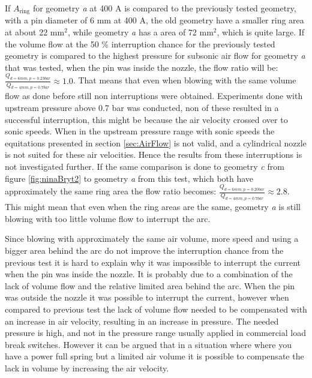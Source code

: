 \documentclass[10pt,a4paper]{article}
\begin{document}
If $A_\mathrm{{ring}}$ for geometry \textit{a} at 400 A is compared to the previously tested geometry, with a pin diameter of 6 mm at 400 A, the old geometry have a smaller ring area at about 22 $\mathrm{{mm^2}}$, while geometry \textit{a} has a area of 72 $\mathrm{{mm^2}}$, which is quite large. If the volume flow at the 50 \% interruption chance for the previously tested geometry is compared to the highest pressure for subsonic air flow for geometry \textit{a} that was tested, when the pin was inside the nozzle, the flow ratio will be: $\frac{Q_{d=6 mm, p=0.23 bar}}{Q_{d=4 mm, p=0.7 bar}}\approx 1.0$. That means that even when blowing with the same volume flow as done before still non interruptions were obtained. Experiments done with upstream pressure above 0.7 bar was conducted, non of these resulted in a successful interruption, this might be because the air velocity crossed over to sonic speeds. When in the upstream pressure range with sonic speeds the equitations presented in section \ref{sec:AirFlow} is not valid, and a cylindrical nozzle is not suited for these air velocities. Hence the results from these interruptions is not investigated further. If the same comparison is done to geometry \textit{c} from figure \ref{fig:ninaBryt2} to geometry \textit{a} from this test, which both have approximately the same ring area the flow ratio becomes: $\frac{Q_{d=6 mm, p=0.20 bar}}{Q_{d=4 mm, p=0.7 bar}}\approx 2.8$. This might mean that even when the ring areas are the same, geometry \textit{a} is still blowing with too little volume flow to interrupt the arc.

Since blowing with approximately the same air volume, more speed and using a bigger area behind the arc do not improve the interruption chance from the previous test it is hard to explain why it was impossible to interrupt the current when the pin was inside the nozzle. It is probably due to a combination of the lack of volume flow and the relative limited area behind the arc. When the pin was outside the nozzle it was possible to interrupt the current, however when compared to previous test the lack of volume flow needed to be compensated with an increase in air velocity, resulting in an increase in pressure. The needed pressure is high, and not in the pressure range usually applied in commercial load break switches. However it can be argued that in a situation where where you have a power full spring but a limited air volume it is possible to compensate the lack in volume by increasing the air velocity.
\end{document}
